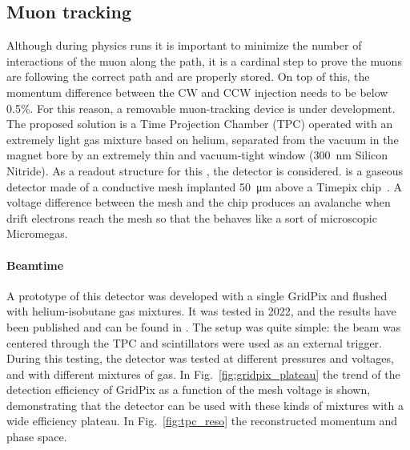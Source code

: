 \begin{refsection}
    \subsection{Muon tracking}
    \label{sec:muEDM:gridpix:beamtime}
        Although during physics runs it is important to minimize the number of interactions of the muon along the path, it is a cardinal step to prove the muons are following the correct path and are properly stored.
        On top of this, the momentum difference between the CW and CCW injection needs to be below 0.5\%.
        For this reason, a removable muon-tracking device is under development.
        The proposed solution is a Time Projection Chamber (TPC) operated with an extremely light gas mixture based on helium, separated from the vacuum in the magnet bore by an extremely thin and vacuum-tight window (\SI{300}{\nano\meter} Silicon Nitride). 
        As a readout structure for this \tpc, the \grid detector is considered. 
        \grid is a gaseous detector made of a conductive mesh implanted \SI{50}{\micro\meter} above a Timepix chip~\cite{Llopart2007NIMA}.
        A voltage difference between the mesh and the chip produces an avalanche when drift electrons reach the mesh so that the \grid behaves like a sort of microscopic Micromegas.

        \paragraph{Beamtime}
        A prototype of this detector was developed with a single GridPix and flushed with helium-isobutane gas mixtures. 
        It was tested in 2022, and the results have been published and can be found in \cite{muEDM:PSI:GridPix}.
        The setup was quite simple: the beam was centered through the TPC and scintillators were used as an external trigger.
        During this testing, the detector was tested at different pressures and voltages, and with different mixtures of gas.
        In Fig.~\ref{fig:gridpix_plateau} the trend of the detection efficiency of GridPix as a function of the mesh voltage is shown, demonstrating that the detector can be used with these kinds of mixtures with a wide efficiency plateau.
        In Fig.~\ref{fig:tpc_reso} the reconstructed momentum and phase space.\\


\end{refsection}

